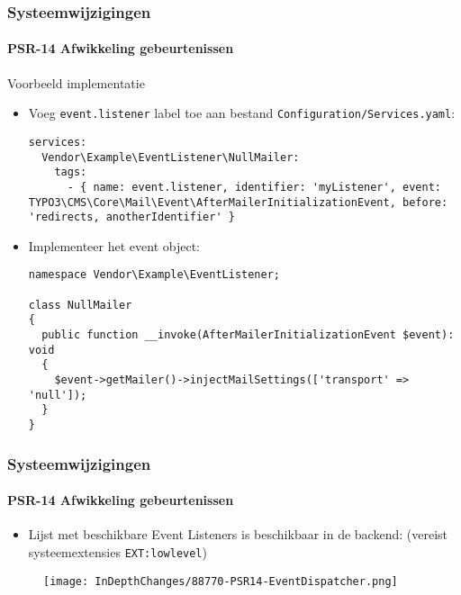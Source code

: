 \begin{frame}[fragile]
	\frametitle{Systeemwijzigingen}
	\framesubtitle{PSR-14 Afwikkeling gebeurtenissen}

	\lstset{basicstyle=\tiny\ttfamily}

	Voorbeeld implementatie

	\begin{itemize}\smaller
		\item[\ding{202}] Voeg \texttt{event.listener} label toe aan bestand \texttt{Configuration/Services.yaml}:
\begin{lstlisting}
services:
  Vendor\Example\EventListener\NullMailer:
    tags:
      - { name: event.listener, identifier: 'myListener', event: TYPO3\CMS\Core\Mail\Event\AfterMailerInitializationEvent, before: 'redirects, anotherIdentifier' }
\end{lstlisting}

		\item[\ding{203}] Implementeer het event object:
\begin{lstlisting}
namespace Vendor\Example\EventListener;

class NullMailer
{
  public function __invoke(AfterMailerInitializationEvent $event): void
  {
    $event->getMailer()->injectMailSettings(['transport' => 'null']);
  }
}
\end{lstlisting}

	\end{itemize}\normalsize

\end{frame}


\begin{frame}[fragile]
	\frametitle{Systeemwijzigingen}
	\framesubtitle{PSR-14 Afwikkeling gebeurtenissen}

	\lstset{basicstyle=\tiny\ttfamily}

	\begin{itemize}
		\item Lijst met beschikbare Event Listeners is beschikbaar in de backend:\newline
			\smaller
				(vereist systeemextensies \texttt{EXT:lowlevel})
			\normalsize
	\end{itemize}

	\begin{figure}
		\texttt{[image: InDepthChanges/88770-PSR14-EventDispatcher.png]}
	\end{figure}

\end{frame}

